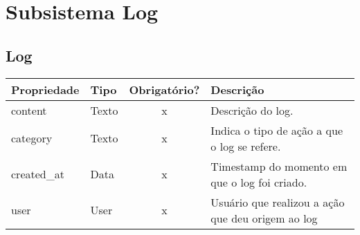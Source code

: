 \newpage

\section{Subsistema Log}

\subsection{Log} \label{Log}
\begin{table}[H]
	\footnotesize
	\begin{tabularx}{\textwidth}{|X|X|c|p{7.8cm}|}   \hline \rowcolor[rgb]{0.8,0.8,0.8}
		
		\textbf{Propriedade} & \textbf{Tipo} & \textbf{Obrigatório?} & \centerline{\textbf{Descrição}} \\\hline  	
		
		content & Texto & x & Descrição do log. \\\hline		
		category & Texto & x & Indica o tipo de ação a que o log se refere. \\\hline
		created\_at & Data & x & Timestamp do momento em que o log foi criado. \\\hline
		user & User & x & Usuário que realizou a ação que deu origem ao log \\\hline	
		
	\end{tabularx}	
\end{table}
